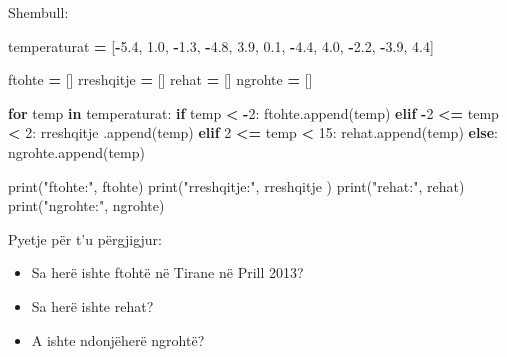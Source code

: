\documentclass[
  ignorenonframetext,
]{beamer}
\newenvironment{Shaded}{\begin{snugshade}}{\end{snugshade}}
\newcommand{\BuiltInTok}[1]{#1}
\newcommand{\ControlFlowTok}[1]{\textcolor[rgb]{0.13,0.29,0.53}{\textbf{#1}}}
\newcommand{\DecValTok}[1]{\textcolor[rgb]{0.00,0.00,0.81}{#1}}
\newcommand{\FloatTok}[1]{\textcolor[rgb]{0.00,0.00,0.81}{#1}}
\newcommand{\KeywordTok}[1]{\textcolor[rgb]{0.13,0.29,0.53}{\textbf{#1}}}
\newcommand{\NormalTok}[1]{#1}
\newcommand{\OperatorTok}[1]{\textcolor[rgb]{0.81,0.36,0.00}{\textbf{#1}}}
\newcommand{\StringTok}[1]{\textcolor[rgb]{0.31,0.60,0.02}{#1}}
\begin{document}
\begin{frame}[fragile]{Shembull:}
\protect\hypertarget{shembull-6}{}
\begin{Shaded}
\begin{Highlighting}[]
\NormalTok{temperaturat }\OperatorTok{=}\NormalTok{ [}\OperatorTok{{-}}\FloatTok{5.4}\NormalTok{, }\FloatTok{1.0}\NormalTok{, }\OperatorTok{{-}}\FloatTok{1.3}\NormalTok{, }\OperatorTok{{-}}\FloatTok{4.8}\NormalTok{, }\FloatTok{3.9}\NormalTok{, }\FloatTok{0.1}\NormalTok{, }\OperatorTok{{-}}\FloatTok{4.4}\NormalTok{, }\FloatTok{4.0}\NormalTok{, }\OperatorTok{{-}}\FloatTok{2.2}\NormalTok{, }\OperatorTok{{-}}\FloatTok{3.9}\NormalTok{, }\FloatTok{4.4}\NormalTok{]}

\NormalTok{ftohte }\OperatorTok{=}\NormalTok{ []}
\NormalTok{rreshqitje }\OperatorTok{=}\NormalTok{ []}
\NormalTok{rehat }\OperatorTok{=}\NormalTok{ []}
\NormalTok{ngrohte }\OperatorTok{=}\NormalTok{ []}

\ControlFlowTok{for}\NormalTok{ temp }\KeywordTok{in}\NormalTok{ temperaturat:}
    \ControlFlowTok{if}\NormalTok{ temp }\OperatorTok{\textless{}} \OperatorTok{{-}}\DecValTok{2}\NormalTok{:}
\NormalTok{        ftohte.append(temp)}
    \ControlFlowTok{elif} \OperatorTok{{-}}\DecValTok{2} \OperatorTok{\textless{}=}\NormalTok{ temp }\OperatorTok{\textless{}} \DecValTok{2}\NormalTok{:}
\NormalTok{        rreshqitje .append(temp)}
    \ControlFlowTok{elif} \DecValTok{2} \OperatorTok{\textless{}=}\NormalTok{ temp }\OperatorTok{\textless{}} \DecValTok{15}\NormalTok{:}
\NormalTok{        rehat.append(temp)}
    \ControlFlowTok{else}\NormalTok{:}
\NormalTok{        ngrohte.append(temp)}

\BuiltInTok{print}\NormalTok{(}\StringTok{"ftohte:"}\NormalTok{, ftohte)}
\BuiltInTok{print}\NormalTok{(}\StringTok{"rreshqitje:"}\NormalTok{, rreshqitje )}
\BuiltInTok{print}\NormalTok{(}\StringTok{"rehat:"}\NormalTok{, rehat)}
\BuiltInTok{print}\NormalTok{(}\StringTok{"ngrohte:"}\NormalTok{, ngrohte)}
\end{Highlighting}
\end{Shaded}
\end{frame}

\begin{frame}{Pyetje për t'u përgjigjur:}
\protect\hypertarget{pyetje-puxebr-tu-puxebrgjigjur}{}
\begin{itemize}
\item
  Sa herë ishte ftohtë në Tirane në Prill 2013?
\item
  Sa herë ishte rehat?
\item
  A ishte ndonjëherë ngrohtë?
\end{itemize}
\end{frame}
\end{document}
